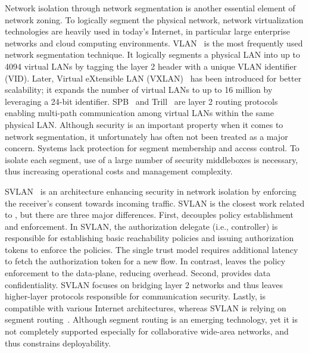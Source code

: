 Network isolation through network segmentation is another essential element of network zoning. 
To logically segment the physical network, network virtualization technologies are heavily used in today's Internet, in particular large enterprise networks and cloud computing environments.
VLAN~\cite{ieee2018vlan} is the most frequently used network segmentation technique.
It logically segments a physical LAN into up to 4094 virtual LANs by tagging the layer 2 header with a unique VLAN identifier (VID).
Later, Virtual eXtensible LAN (VXLAN)~\cite{rfc7348} has been introduced for better scalability; it expands the number of virtual LANs to up to 16 million by leveraging a 24-bit identifier.
SPB~\cite{ieee2012spb} and Trill~\cite{rfc6325,rfc7176} are layer 2 routing protocols enabling multi-path communication among virtual LANs within the same physical LAN. 
Although security is an important property when it comes to network segmentation, it unfortunately
has often not been treated as a major concern. Systems lack protection for segment membership and access control.
To isolate each segment, use of a large number of security middleboxes is necessary, thus increasing operational costs and management complexity. 

SVLAN~\cite{kwon2020svlan} is an architecture enhancing security in network isolation by enforcing the receiver's consent towards incoming traffic. 
SVLAN is the closest work related to \name, but there are three major differences.
First, \name decouples policy establishment and enforcement. In SVLAN, the authorization delegate (i.e., controller) is responsible for establishing basic reachability policies and issuing authorization tokens to enforce the policies.
The single trust model requires additional latency to fetch the authorization token for a new flow.
In contrast, \name leaves the policy enforcement to the data-plane, reducing overhead.
Second, \name provides data confidentiality.
SVLAN focuses on bridging layer 2 networks and thus leaves higher-layer protocols responsible for communication security. 
Lastly, \name is compatible with various Internet architectures, whereas SVLAN is relying on segment routing~\cite{rfc8402,rfc8660}. 
Although segment routing is an emerging technology, yet it is not completely supported especially for collaborative wide-area networks, and thus constrains deployability.

